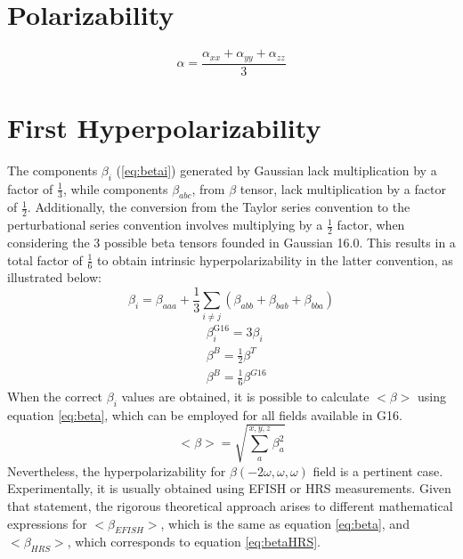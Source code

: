 \documentclass{article}
\begin{document}
	\section{Polarizability}
	\begin{equation}\label{eq:alpha}
	\alpha = \frac{{\alpha_{xx}} + {\alpha_{yy}} + {\alpha_{zz}}}{3} 
	\end{equation}
	
	\section{First Hyperpolarizability}
	The components $\beta_i$ (\ref{eq:betai}) generated by Gaussian lack multiplication by a factor of $\frac{1}{3}$, while components $\beta_{abc}$, from $\beta$ tensor, lack multiplication by a factor of $\frac{1}{2}$. Additionally, the conversion from the Taylor series convention to the perturbational series convention involves multiplying by a $\frac{1}{2}$ factor, when considering the 3 possible beta tensors founded in Gaussian 16.0. This results in a total factor of $\frac{1}{6}$ to obtain intrinsic hyperpolarizability in the latter convention, as illustrated below:
	\begin{equation}\label{eq:betai}
	\beta_i = \beta_{aaa}+\frac {1}{3}\sum_{i\neq j}(\beta_{abb}+\beta_{bab}+\beta_{bba})
	\end{equation}
	\begin{align*}
	&\beta_i^{\text{G16}} = 3\beta_i \\
	&\beta^{B} = \frac{1}{2} \beta^{T} \\
	&\beta^{B} =  \frac{1}{6}\beta^{G16}
	\end{align*}
	When the correct $\beta_i$ values are obtained, it is possible to calculate $<\beta>$ using equation \ref{eq:beta}, which can be employed for all fields available in G16.
	\begin{equation}\label{eq:beta}
	<\beta>=\sqrt{\sum_{a}^{x,y,z}\beta^{2}_{a}}
	\end{equation}
	Nevertheless, the hyperpolarizability for $\beta(-2\omega , \omega , \omega)$ field is a pertinent case. Experimentally, it is usually obtained using EFISH or HRS measurements. Given that statement, the rigorous theoretical approach arises to different mathematical expressions for $<\beta_{EFISH}>$, which is the same as equation \ref{eq:beta}, and $<\beta_{HRS}>$, which corresponds to equation \ref{eq:betaHRS}. 
	
\end{document}
